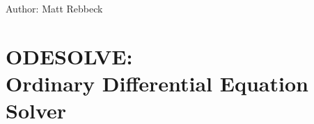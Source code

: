 Author: Matt Rebbeck

\newpage

\section[ODESOLVE: Ordinary Differential Equation Solver]%
        {ODESOLVE: \protect\\ Ordinary Differential Equation Solver}


